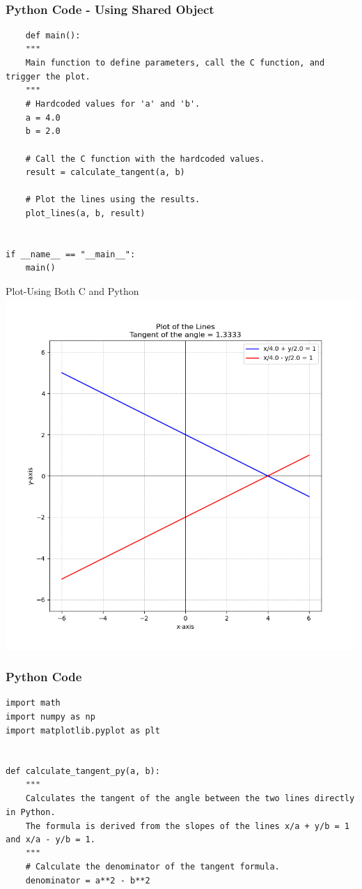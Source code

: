 \documentclass{beamer}
\begin{document}
\begin{frame}[fragile]
     \frametitle{Python Code - Using Shared Object}
     \begin{lstlisting}
    def main():
    """
    Main function to define parameters, call the C function, and trigger the plot.
    """
    # Hardcoded values for 'a' and 'b'.
    a = 4.0
    b = 2.0

    # Call the C function with the hardcoded values.
    result = calculate_tangent(a, b)

    # Plot the lines using the results.
    plot_lines(a, b, result)


if __name__ == "__main__":
    main()

     \end{lstlisting}
     \end{frame}



\begin{frame}{Plot-Using Both C and Python}
    \centering
    \includegraphics[width=\columnwidth, height=0.8\textheight, keepaspectratio]{figs/line.png}     
\end{frame}

\begin{frame}[fragile]
    \frametitle{Python Code}
    \begin{lstlisting}
import math
import numpy as np
import matplotlib.pyplot as plt


def calculate_tangent_py(a, b):
    """
    Calculates the tangent of the angle between the two lines directly in Python.
    The formula is derived from the slopes of the lines x/a + y/b = 1 and x/a - y/b = 1.
    """
    # Calculate the denominator of the tangent formula.
    denominator = a**2 - b**2

   


\end{lstlisting}
\end{frame}
\end{document}
